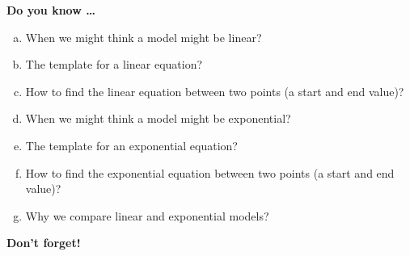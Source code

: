 \newpage



\bigskip

\noindent \textbf{Do you know \ldots} %

\begin{enumerate} [(a)]
\item When we might think a model might be linear? 
\item The template for a linear equation? 
\item How to find the linear equation between two points (a start and end value)? 

\item When we might think a model might be exponential? 
\item The template for an exponential equation? 
\item How to find the exponential equation between two points (a start and end value)? 

\item Why we compare linear and exponential models? 
\end{enumerate}

\bigskip

\noindent \textbf{Don't forget!}
